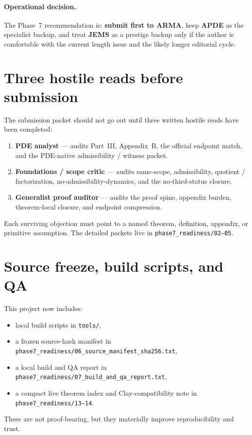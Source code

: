\documentclass[11pt]{article}
\begin{document}
\paragraph{Operational decision.}
The Phase~7 recommendation is: \textbf{submit first to ARMA}, keep \textbf{APDE} as the specialist backup, and treat \textbf{JEMS} as a prestige backup only if the author is comfortable with the current length issue and the likely longer editorial cycle.

\section{Three hostile reads before submission}
The submission packet should not go out until three written hostile reads have been completed:
\begin{enumerate}[leftmargin=1.5em]
\item \textbf{PDE analyst} --- audits Part~III, Appendix~B, the official endpoint match, and the PDE-native admissibility / witness packet.
\item \textbf{Foundations / scope critic} --- audits same-scope, admissibility, quotient / factorization, no-admissibility-dynamics, and the no-third-status closure.
\item \textbf{Generalist proof auditor} --- audits the proof spine, appendix burden, theorem-local closure, and endpoint compression.
\end{enumerate}
Each surviving objection must point to a named theorem, definition, appendix, or primitive assumption. The detailed packets live in \texttt{phase7\_readiness/02--05}.

\section{Source freeze, build scripts, and QA}
This project now includes:
\begin{itemize}[leftmargin=1.5em]
\item local build scripts in \texttt{tools/},
\item a frozen source-hash manifest in \texttt{phase7\_readiness/06\_source\_manifest\_sha256.txt},
\item a local build and QA report in \texttt{phase7\_readiness/07\_build\_and\_qa\_report.txt},
\item a compact live theorem index and Clay-compatibility note in \texttt{phase7\_readiness/13--14}.
\end{itemize}
These are not proof-bearing, but they materially improve reproducibility and trust.
\end{document}
